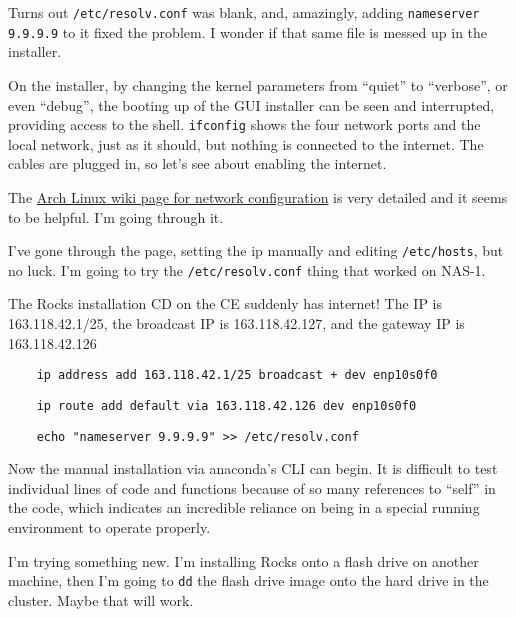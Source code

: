 \documentclass[12pt]{article}
\begin{document}
\qq Turns out {\tt /etc/resolv.conf} was blank, and, amazingly, adding
{\tt nameserver 9.9.9.9} to it fixed the problem. I wonder if that same file is
messed up in the installer.

\qq On the installer, by changing the kernel parameters from ``quiet'' to
``verbose'', or even ``debug'', the booting up of the GUI installer can be seen
and interrupted, providing access to the shell. {\tt ifconfig} shows the four
network ports and the local network, just as it should, but nothing is connected
to the internet. The cables are plugged in, so let's see about enabling the
internet.

\qq The \href{https://wiki.archlinux.org/index.php/Network_configuration}{Arch
  Linux wiki page for network configuration} is very detailed and it seems to be
helpful. I'm going through it.

\qq I've gone through the page, setting the ip manually and editing
{\tt /etc/hosts}, but no luck. I'm going to try the {\tt /etc/resolv.conf} thing
that worked on NAS-1.

\qq The Rocks installation CD on the CE suddenly has internet!  The IP is
163.118.42.1/25, the broadcast IP is 163.118.42.127, and the gateway IP is
163.118.42.126

\begin{tcolorbox}[title=Enable Internet in Boot CD, colback=white,
  colframe=black, coltitle=green]
  \begin{verbatim}
    ip address add 163.118.42.1/25 broadcast + dev enp10s0f0
  \end{verbatim}
  \begin{verbatim}
    ip route add default via 163.118.42.126 dev enp10s0f0
  \end{verbatim}
  \begin{verbatim}
    echo "nameserver 9.9.9.9" >> /etc/resolv.conf
  \end{verbatim}
\end{tcolorbox}

\qq Now the manual installation via anaconda's CLI can begin.  It is difficult
to test individual lines of code and functions because of so many references to
``self'' in the code, which indicates an incredible reliance on being in a
special running environment to operate properly.

\qq I'm trying something new. I'm installing Rocks onto a flash drive on another
machine, then I'm going to {\tt dd} the flash drive image onto the hard drive in
the cluster. Maybe that will work.
\end{document}
